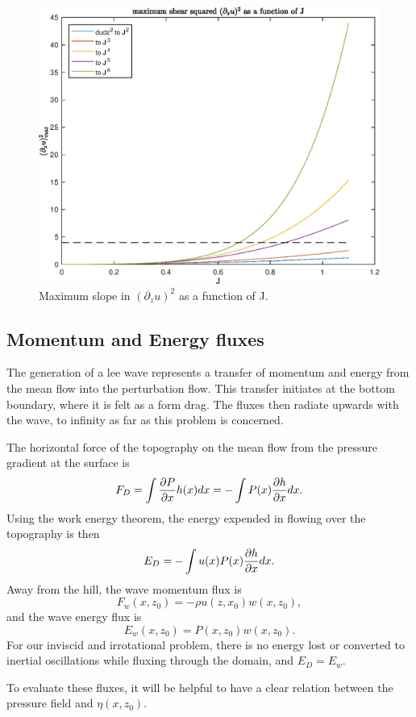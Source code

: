 \documentclass[12pt]{article}
\begin{document}
\begin{figure}
	\centering
	\includegraphics[width=1\textwidth]{max_shearsq.eps}
	\caption{Maximum slope in $(\partial_z u)^2$ as a function of J.}
\end{figure}

\subsection{Momentum and Energy fluxes}
The generation of a lee wave represents a transfer of momentum and energy from the mean flow into the perturbation flow. This transfer initiates at the bottom boundary, where it is felt as a form drag. The fluxes then radiate upwards with the wave, to infinity as far as this problem is concerned. 

The horizontal force of the topography on the mean flow from the pressure gradient at the surface is 
\[
F_D =  \int \frac{\partial{P}}{\partial{x}} h(x) dx = -\int P(x) \frac{\partial{h}}{\partial{x}} dx.
\]
Using the work energy theorem, the energy expended in flowing over the topography is then
\[
E_D = -\int u(x)P(x) \frac{\partial{h}}{\partial{x}} dx.
\]
Away from the hill, the wave momentum flux is
\[
F_w(x,z_0) = -\rho u(z,x_0)w(x,z_0),
\]
and the wave energy flux is
\[
E_w(x,z_0) = P(x,z_0)w(x,z_0).
\]
For our inviscid and irrotational problem, there is no energy lost or converted to inertial oscillations while fluxing through the domain, and $E_D = E_w$.

To evaluate these fluxes, it will be helpful to have a clear relation between the pressure field and $\eta(x,z_0)$.
\end{document}
